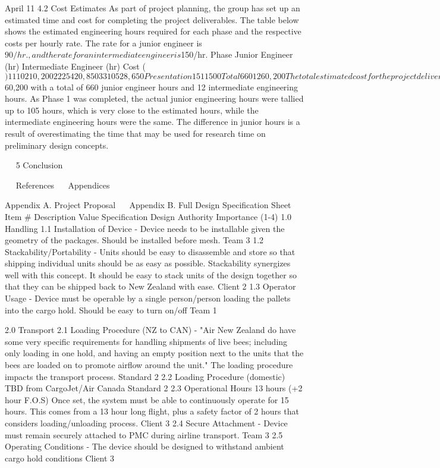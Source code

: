 April 11
4.2	Cost Estimates
As part of project planning, the group has set up an estimated time and cost for completing the project deliverables. The table below shows the estimated engineering hours required for each phase and the respective costs per hourly rate. The rate for a junior engineer is $90/hr., and the rate for an intermediate engineer is $150/hr. 
Phase	Junior Engineer (hr)	Intermediate Engineer (hr)	Cost ($)
1	110	2	10,200
2	225	4	20,850
3	310	5	28,650
Presentation	15	1	1500
Total	660	12	60,200

The total estimated cost for the project deliverables is expected to be $60,200 with a total of 660 junior engineer hours and 12 intermediate engineering hours. As Phase 1 was completed, the actual junior engineering hours were tallied up to 105 hours, which is very close to the estimated hours, while the intermediate engineering hours were the same. The difference in junior hours is a result of overestimating the time that may be used for research time on preliminary design concepts. 


 
5	Conclusion


 
References
 
Appendices

Appendix A.	Project Proposal
 
Appendix B.	Full Design Specification Sheet
Item #	Description 	Value	Specification	Design Authority	Importance (1-4)
1.0	Handling	 	 	 	 
1.1	Installation of Device	-	Device needs to be installable given the geometry of the packages. Should be installed before mesh.	Team	3
1.2	Stackability/Portability	-	Units should be easy to disassemble and store so that shipping individual units should be as easy as possible. Stackability synergizes well with this concept.
It should be easy to stack units of the design together so that they can be shipped back to New Zealand with ease.	Client	2
1.3	Operator Usage	-	Device must be operable by a single person/person loading the pallets into the cargo hold. Should be easy to turn on/off	Team	1
					
2.0	Transport	 	 	 	 
2.1	Loading Procedure
 (NZ to CAN)	-	"Air New Zealand do have some very specific requirements for handling shipments of live bees; including only loading in one hold, and having an empty position next to the units that the bees are loaded on to promote airflow around the unit." The loading procedure impacts the transport process.	Standard	2
2.2	Loading Procedure
 (domestic)		TBD from CargoJet/Air Canada	Standard	2
2.3	Operational Hours	13 hours (+2 hour F.O.S)	Once set, the system must be able to continuously operate for 15 hours. This comes from a 13 hour long flight, plus a safety factor of 2 hours that considers loading/unloading process.	Client	3
2.4	Secure Attachment	-	Device must remain securely attached to PMC during airline transport.	Team	3
2.5	Operating Conditions	-	The device should be designed to withstand ambient cargo hold conditions	Client	3
					
